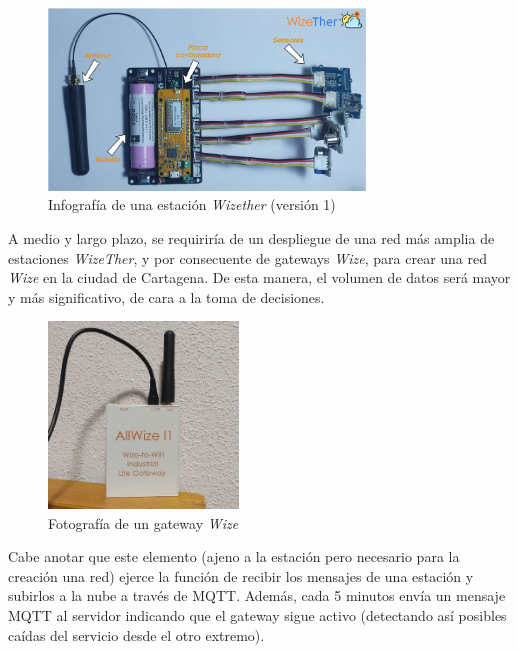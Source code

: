 \documentclass[12pt]{article}
\begin{document}
 \begin{figure}[h]
 	\begin{center}
 		\includegraphics[width=0.75\textwidth]{img/info_wize_sensor_v1.png}
 		\caption{Infografía de una estación \textit{Wizether} (versión 1)}
 	\end{center}
 \end{figure}

\pagebreak

\noindent A medio y largo plazo, se requiriría de un despliegue de una red más amplia de estaciones \textit{WizeTher}, y por consecuente de gateways \textit{Wize}, para crear una red \textit{Wize} en la ciudad de Cartagena. De esta manera, el volumen de datos será mayor y más significativo, de cara a la toma de decisiones. \\

\begin{figure}[h]
	\begin{center}
		\includegraphics[width=0.45\textwidth]{img/gateway_wize.png}
		\caption{Fotografía de un gateway \textit{Wize}}
	\end{center}
\end{figure}

\noindent Cabe anotar que este elemento (ajeno a la estación pero necesario para la creación una red) ejerce la función de recibir los mensajes de una estación y subirlos a la nube a través de MQTT. Además, cada 5 minutos envía un mensaje MQTT al servidor indicando que el gateway sigue activo (detectando así posibles caídas del servicio desde el otro extremo). \\
\end{document}
